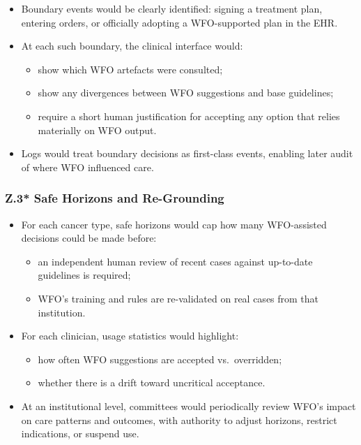 \begin{itemize}
  \item Boundary events would be clearly identified:
        signing a treatment plan, entering orders, or officially adopting a
        WFO-supported plan in the EHR.
  \item At each such boundary, the clinical interface would:
        \begin{itemize}
          \item show which WFO artefacts were consulted;
          \item show any divergences between WFO suggestions and base
                guidelines;
          \item require a short human justification for accepting any
                option that relies materially on WFO output.
        \end{itemize}
  \item Logs would treat boundary decisions as first-class events, enabling
        later audit of where WFO influenced care.
\end{itemize}

\subsubsection*{Z.3* Safe Horizons and Re-Grounding}

\begin{itemize}
  \item For each cancer type, safe horizons would cap how many WFO-assisted
        decisions could be made before:
        \begin{itemize}
          \item an independent human review of recent cases against up-to-date
                guidelines is required;
          \item WFO’s training and rules are re-validated on real cases from
                that institution.
        \end{itemize}
  \item For each clinician, usage statistics would highlight:
        \begin{itemize}
          \item how often WFO suggestions are accepted vs.\ overridden;
          \item whether there is a drift toward uncritical acceptance.
        \end{itemize}
  \item At an institutional level, committees would periodically review
        WFO’s impact on care patterns and outcomes, with authority to adjust
        horizons, restrict indications, or suspend use.
\end{itemize}

